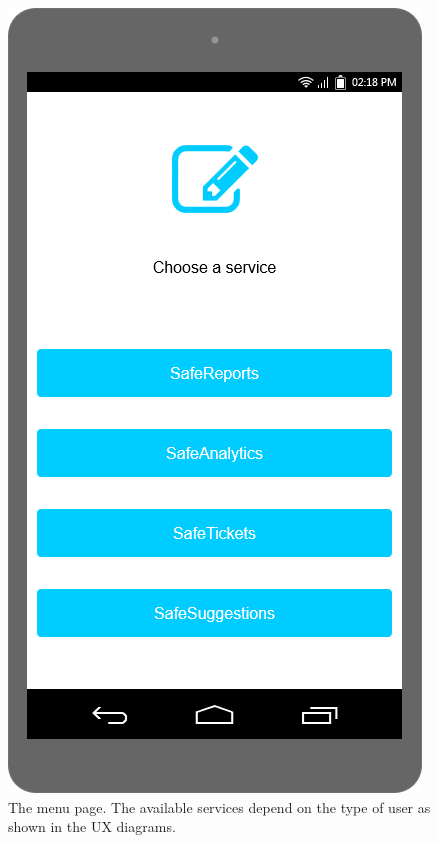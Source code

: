 \documentclass[./main.tex]{subfiles}
\begin{document}
\begin{figure}
\begin{minipage}[t]{\mockupdimension}
    \end{minipage}
    \hfill
    \begin{minipage}[t]{\mockupdimension}
        \includegraphics[width=\textwidth]{resources/Mockups/menu}
        \caption{The menu page. The available services depend on the type of user
                 as shown in the UX diagrams. }
        \label{fig:menu}
    \end{minipage}
\end{figure}
\end{document}
